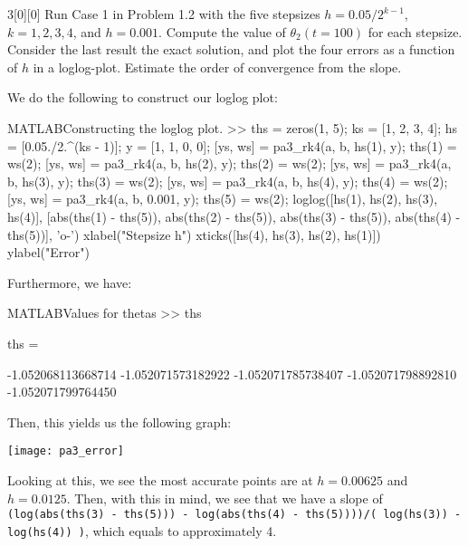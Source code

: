 \documentclass{article}
\begin{document}
\begin{hw}{3}[0][0]
	Run Case 1 in Problem 1.2 with the five stepsizes $h = 0.05/2^{k-1}$, $k = 1, 2, 3, 4$, and $h = 0.001$.
	Compute the value of $\theta_2(t=100)$ for each stepsize. Consider the last result the exact solution,
	and plot the four errors as a function of $h$ in a loglog-plot. Estimate the order of convergence
	from the slope.
\end{hw}
\begin{solution}
We do the following to construct our loglog plot:
\begin{code}{MATLAB}{Constructing the loglog plot.}
>> ths = zeros(1, 5);
ks = [1, 2, 3, 4];
hs = [0.05./2.^(ks - 1)];
y = [1, 1, 0, 0];
[ys, ws] = pa3_rk4(a, b, hs(1), y);
ths(1) = ws(2);
[ys, ws] = pa3_rk4(a, b, hs(2), y);
ths(2) = ws(2);
[ys, ws] = pa3_rk4(a, b, hs(3), y);
ths(3) = ws(2);
[ys, ws] = pa3_rk4(a, b, hs(4), y);
ths(4) = ws(2);
[ys, ws] = pa3_rk4(a, b, 0.001, y);
ths(5) = ws(2);
loglog([hs(1), hs(2), hs(3), hs(4)], [abs(ths(1) - ths(5)), abs(ths(2) - ths(5)), abs(ths(3) - ths(5)), abs(ths(4) - ths(5))], 'o-')
xlabel("Stepsize h")
xticks([hs(4), hs(3), hs(2), hs(1)])
ylabel("Error")
\end{code}

Furthermore, we have:
\begin{code}{MATLAB}{Values for thetas}
>> ths

ths =

-1.052068113668714  -1.052071573182922  -1.052071785738407  -1.052071798892810  -1.052071799764450
\end{code}

Then, this yields us the following graph:
\begin{center}
	\texttt{[image: pa3\_error]}
\end{center}

Looking at this, we see the most accurate points are at $h = 0.00625$ and $h = 0.0125$. Then, with this in mind, we see that we have a slope of \texttt{(log(abs(ths(3) - ths(5))) - log(abs(ths(4) - ths(5))))/( log(hs(3)) - log(hs(4)) )}, which equals to approximately 4.
\end{solution}
\end{document}
